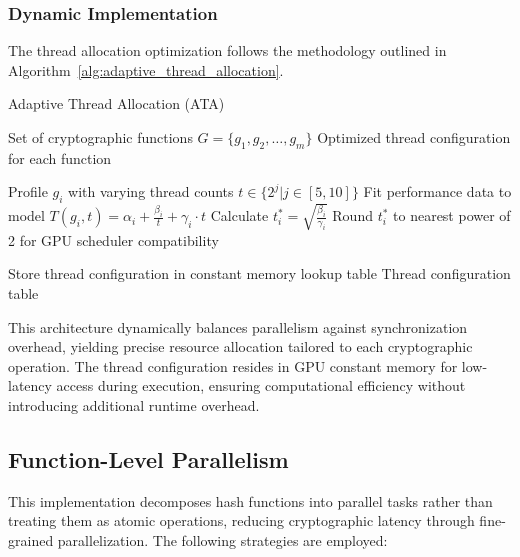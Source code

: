 \documentclass[journal]{IEEEtran}
\begin{document}
\subsubsection{Dynamic Implementation}

The thread allocation optimization follows the methodology outlined in Algorithm~\ref{alg:adaptive_thread_allocation}.

\begin{algorithm}
  \caption{Adaptive Thread Allocation (ATA)}
  \label{alg:adaptive_thread_allocation}
  \begin{algorithmic}[1]
    \REQUIRE Set of cryptographic functions $G = \{g_1, g_2, \ldots, g_m\}$
    \ENSURE Optimized thread configuration for each function

    \STATE Profile $g_i $ with varying thread counts $t \in \{2^j | j \in [5, 10]\}$
    \STATE Fit performance data to model $T(g_i, t) = \alpha_i + \frac{\beta_i}{t} + \gamma_i \cdot t$
    \STATE Calculate $t_i^* = \sqrt{\frac{\beta_i}{\gamma_i}}$
    \STATE Round $t_i^*$ to nearest power of 2 for GPU scheduler compatibility
    \ENDFOR

    \STATE Store thread configuration in constant memory lookup table
    \RETURN Thread configuration table
  \end{algorithmic}
\end{algorithm}

This architecture dynamically balances parallelism against synchronization overhead, yielding precise resource allocation tailored to each cryptographic operation. The thread configuration resides in GPU constant memory for low-latency access during execution, ensuring computational efficiency without introducing additional runtime overhead.

\subsection{Function-Level Parallelism}

This implementation decomposes hash functions into parallel tasks rather than treating them as atomic operations, reducing cryptographic latency through fine-grained parallelization. The following strategies are employed:
\end{document}
